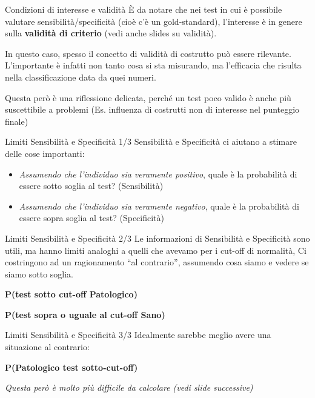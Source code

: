 \documentclass[
  ignorenonframetext,
  aspectratio=169,
]{beamer}
\begin{document}
\begin{frame}{Condizioni di interesse e validità}
\label{condizioni-di-interesse-e-validituxe0}
È da notare che nei test in cui è possibile valutare
sensibilità/specificità (cioè c'è un gold-standard), l'interesse è in
genere sulla \textbf{validità di criterio} (vedi anche slides su
validità).

In questo caso, spesso il concetto di validità di costrutto può essere
rilevante. L'importante è infatti non tanto cosa si sta misurando, ma
l'efficacia che risulta nella classificazione data da quei numeri.

Questa però è una riflessione delicata, perché un test poco valido è
anche più suscettibile a problemi (Es. influenza di costrutti non di
interesse nel punteggio finale)
\end{frame}

\begin{frame}{Limiti Sensibilità e Specificità 1/3}
\label{limiti-sensibilituxe0-e-specificituxe0-13}
Sensibilità e Specificità ci aiutano a stimare delle cose importanti:

\begin{itemize}
\small
\item \emph{Assumendo che l'individuo sia veramente positivo}, quale è la probabilità di essere sotto soglia al test? (Sensibilità)
\item \emph{Assumendo che l'individuo sia veramente negativo}, quale è la probabilità di essere sopra soglia al test? (Specificità) 
\end{itemize}
\end{frame}

\begin{frame}{Limiti Sensibilità e Specificità 2/3}
\label{limiti-sensibilituxe0-e-specificituxe0-23}
Le informazioni di Sensibilità e Specificità sono utili, ma hanno limiti
analoghi a quelli che avevamo per i cut-off di normalità, Ci costringono
ad un ragionamento ``al contrario'', assumendo cosa siamo e vedere se
siamo sotto soglia.

\textbf{P(test sotto cut-off \textbar{} Patologico)}

\textbf{P(test sopra o uguale al cut-off \textbar{} Sano)}
\end{frame}

\begin{frame}{Limiti Sensibilità e Specificità 3/3}
\label{limiti-sensibilituxe0-e-specificituxe0-33}
Idealmente sarebbe meglio avere una situazione al contrario:

\vfill

\textbf{P(Patologico \textbar{} test sotto-cut-off)}

\vfill
\small

\emph{Questa però è molto più difficile da calcolare (vedi slide successive)}
\end{frame}
\end{document}
